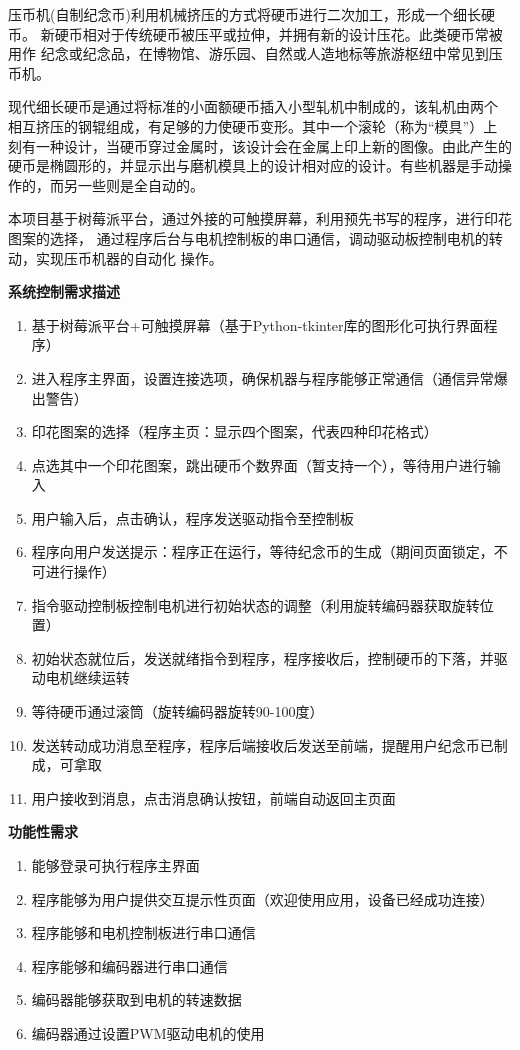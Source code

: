 \documentclass[UTF8,14pt]{article}
\newcommand\sectionone[1]{\centerline{\Large{\bfseries{#1}}}}
\begin{document}
压币机(自制纪念币)利用机械挤压的方式将硬币进行二次加工，形成一个细长硬币。
新硬币相对于传统硬币被压平或拉伸，并拥有新的设计压花。此类硬币常被用作
纪念或纪念品，在博物馆、游乐园、自然或人造地标等旅游枢纽中常见到压币机。

现代细长硬币是通过将标准的小面额硬币插入小型轧机中制成的，该轧机由两个
相互挤压的钢辊组成，有足够的力使硬币变形。其中一个滚轮（称为“模具”）上
刻有一种设计，当硬币穿过金属时，该设计会在金属上印上新的图像。由此产生的
硬币是椭圆形的，并显示出与磨机模具上的设计相对应的设计。有些机器是手动操
作的，而另一些则是全自动的。

本项目基于树莓派平台，通过外接的可触摸屏幕，利用预先书写的程序，进行印花图案的选择，
通过程序后台与电机控制板的串口通信，调动驱动板控制电机的转动，实现压币机器的自动化
操作。

\vspace{0.5cm}
\sectionone{系统控制需求描述}

\begin{enumerate}
	\item 基于树莓派平台+可触摸屏幕（基于Python-tkinter库的图形化可执行界面程序）
	\item 进入程序主界面，设置连接选项，确保机器与程序能够正常通信（通信异常爆出警告）
	\item 印花图案的选择（程序主页：显示四个图案，代表四种印花格式）
	\item 点选其中一个印花图案，跳出硬币个数界面（暂支持一个），等待用户进行输入
	\item 用户输入后，点击确认，程序发送驱动指令至控制板
	\item 程序向用户发送提示：程序正在运行，等待纪念币的生成（期间页面锁定，不可进行操作）
	\item 指令驱动控制板控制电机进行初始状态的调整（利用旋转编码器获取旋转位置）
	\item 初始状态就位后，发送就绪指令到程序，程序接收后，控制硬币的下落，并驱动电机继续运转
	\item 等待硬币通过滚筒（旋转编码器旋转90-100度）
	\item 发送转动成功消息至程序，程序后端接收后发送至前端，提醒用户纪念币已制成，可拿取
	\item 用户接收到消息，点击消息确认按钮，前端自动返回主页面
\end{enumerate}

\vspace{0.5cm}
\sectionone{功能性需求}
\begin{enumerate}
	\item 能够登录可执行程序主界面
	\item 程序能够为用户提供交互提示性页面（欢迎使用应用，设备已经成功连接）
	\item 程序能够和电机控制板进行串口通信
	\item 程序能够和编码器进行串口通信
	\item 编码器能够获取到电机的转速数据
	\item 编码器通过设置PWM驱动电机的使用
\end{enumerate}
\end{document}
